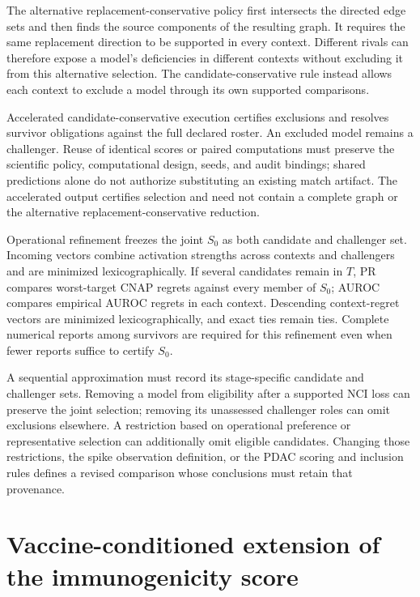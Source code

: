 \documentclass[11pt]{article}
\begin{document}
The alternative replacement-conservative policy first intersects the directed
edge sets and then finds the source components of the resulting graph. It
requires the same replacement direction to be supported in every context.
Different rivals can therefore expose a model's deficiencies in different
contexts without excluding it from this alternative selection. The
candidate-conservative rule instead allows each context to exclude a model
through its own supported comparisons.

Accelerated candidate-conservative execution certifies exclusions and resolves
survivor obligations against the full declared roster. An excluded model
remains a challenger. Reuse of identical scores or paired computations must
preserve the scientific policy, computational design, seeds, and audit
bindings; shared predictions alone do not authorize substituting an existing
match artifact. The accelerated output certifies selection and need not contain
a complete graph or the alternative replacement-conservative reduction.

Operational refinement freezes the joint \(S_0\) as both candidate and
challenger set. Incoming vectors combine activation strengths across contexts
and challengers and are minimized lexicographically. If several candidates
remain in \(T\), PR compares worst-target CNAP regrets against every member of
\(S_0\); AUROC compares empirical AUROC regrets in each context. Descending
context-regret vectors are minimized lexicographically, and exact ties remain
ties. Complete numerical reports among survivors are required for this
refinement even when fewer reports suffice to certify \(S_0\).

A sequential approximation must record its stage-specific candidate and
challenger sets. Removing a model from eligibility after a supported NCI loss
can preserve the joint selection; removing its unassessed challenger roles can
omit exclusions elsewhere. A restriction based on operational preference or
representative selection can additionally omit eligible candidates. Changing
those restrictions, the spike observation definition, or the PDAC scoring and
inclusion rules defines a revised comparison whose conclusions must retain
that provenance.


\section{Vaccine-conditioned extension of the immunogenicity score}
\label{app:vaccine-conditioned-score}
\end{document}
